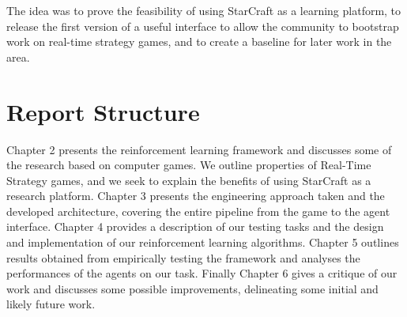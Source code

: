 The idea was to prove the feasibility of using StarCraft as a learning platform,
to release the first version of a useful interface to allow the community to
bootstrap work on real-time strategy games, and to create a baseline for later
work in the area.

\section{Report Structure}

Chapter 2 presents the reinforcement learning framework and discusses some of
the research based on computer games. We outline properties of Real-Time
Strategy games, and we seek to explain the benefits of using StarCraft as a
research platform. Chapter 3 presents the engineering approach taken and the
developed architecture, covering the entire pipeline from the game to the agent
interface. Chapter 4 provides a description of our testing tasks and the design
and implementation of our reinforcement learning algorithms. Chapter 5 outlines
results obtained from empirically testing the framework and analyses the
performances of the agents on our task. Finally Chapter 6 gives a critique of
our work and discusses some possible improvements, delineating some initial and
likely future work.
